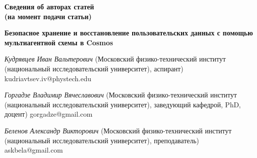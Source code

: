 \clearpage
{}
\markboth{}{}
\begingroup
\begin{center}
\Large \bfseries Сведения об авторах статей\\
\normalsize (на момент подачи статьи)
\end{center}

\newcommand{\auth}[3]{\noindent\parbox{\textwidth}{%
{\itshape #1} (#2) #3\par}}

\newcommand{\tit}[1]{\noindent\parbox{\textwidth}{%
\raggedright\bfseries #1 \par}\vspace{1pt}}

\small

\tit{Безопасное хранение и восстановление пользовательских данных с помощью мультиагентной схемы в Cosmos}
\auth{Кудрявцев Иван Вальтерович}{Московский физико-технический институт (национальный исследовательский университет), аспирант}{kudriavtsev.iv@phystech.edu}
\auth{Горгадзе Владимир Вячеславович}{Московский физико-технический институт (национальный исследовательский университет), заведующий кафедрой, PhD, доцент}{gorgadze@gmail.com}
\auth{Беленов Александр Викторович}{Московский физико-технический институт (национальный исследовательский университет), преподаватель}{askbela@gmail.com}



\endgroup
